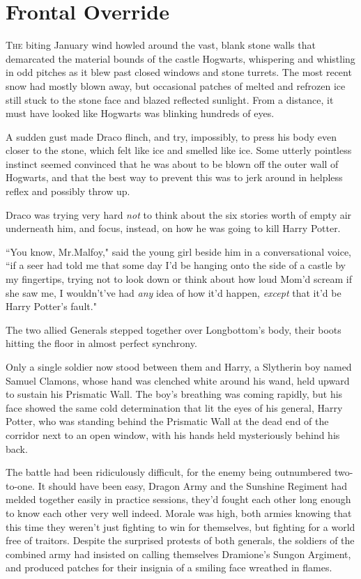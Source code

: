 \chapter{Frontal Override}

\lettrine{T}{he} biting January wind howled around the vast, blank stone walls that demarcated the material bounds of the castle Hogwarts, whispering and whistling in odd pitches as it blew past closed windows and stone turrets. The most recent snow had mostly blown away, but occasional patches of melted and refrozen ice still stuck to the stone face and blazed reflected sunlight. From a distance, it must have looked like Hogwarts was blinking hundreds of eyes.

A sudden gust made Draco flinch, and try, impossibly, to press his body even closer to the stone, which felt like ice and smelled like ice. Some utterly pointless instinct seemed convinced that he was about to be blown off the outer wall of Hogwarts, and that the best way to prevent this was to jerk around in helpless reflex and possibly throw up.

Draco was trying very hard \emph{not} to think about the six stories worth of empty air underneath him, and focus, instead, on how he was going to kill Harry Potter.

``You know, Mr.\?Malfoy," said the young girl beside him in a conversational voice, ``if a seer had told me that some day I'd be hanging onto the side of a castle by my fingertips, trying not to look down or think about how loud Mom'd scream if she saw me, I wouldn't've had \emph{any} idea of how it'd happen, \emph{except} that it'd be Harry Potter's fault."


The two allied Generals stepped together over Longbottom's body, their boots hitting the floor in almost perfect synchrony.

Only a single soldier now stood between them and Harry, a Slytherin boy named Samuel Clamons, whose hand was clenched white around his wand, held upward to sustain his Prismatic Wall. The boy's breathing was coming rapidly, but his face showed the same cold determination that lit the eyes of his general, Harry Potter, who was standing behind the Prismatic Wall at the dead end of the corridor next to an open window, with his hands held mysteriously behind his back.

The battle had been ridiculously difficult, for the enemy being outnumbered two-to-one. It should have been easy, Dragon Army and the Sunshine Regiment had melded together easily in practice sessions, they'd fought each other long enough to know each other very well indeed. Morale was high, both armies knowing that this time they weren't just fighting to win for themselves, but fighting for a world free of traitors. Despite the surprised protests of both generals, the soldiers of the combined army had insisted on calling themselves Dramione's Sungon Argiment, and produced patches for their insignia of a smiling face wreathed in flames.

